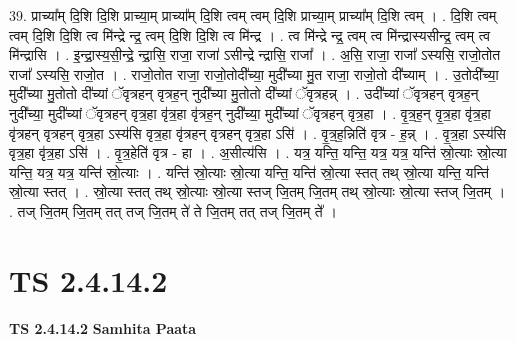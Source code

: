 \documentclass[17pt]{extarticle}
\begin{document}
39. प्राच्या᳚म् दि॒शि दि॒शि प्राच्या॒म् प्राच्या᳚म् दि॒शि त्वम् त्वम् दि॒शि प्राच्या॒म् प्राच्या᳚म् दि॒शि त्वम् । . दि॒शि त्वम् त्वम् दि॒शि दि॒शि त्व मि॑न्द्रे न्द्र॒ त्वम् दि॒शि दि॒शि त्व मि॑न्द्र । . त्व मि॑न्द्रे न्द्र॒ त्वम् त्व मि॑न्द्रास्यसीन्द्र॒ त्वम् त्व मि॑न्द्रासि । . इ॒न्द्रा॒स्य॒सी॒न्द्रे॒ न्द्रा॒सि॒ राजा॒ राजा॑ ऽसीन्द्रे न्द्रासि॒ राजा᳚ । . अ॒सि॒ राजा॒ राजा᳚ ऽस्यसि॒ राजो॒तोत राजा᳚ ऽस्यसि॒ राजो॒त । . राजो॒तोत राजा॒ राजो॒तोदी᳚च्या॒ मुदी᳚च्या मु॒त राजा॒ राजो॒तो दी᳚च्याम् । . उ॒तोदी᳚च्या॒ मुदी᳚च्या मु॒तोतो दी᳚च्यां ॅवृत्रहन् वृत्रह॒न् नुदी᳚च्या मु॒तोतो दी᳚च्यां ॅवृत्रहन्न् । . उदी᳚च्यां ॅवृत्रहन् वृत्रह॒न् नुदी᳚च्या॒ मुदी᳚च्यां ॅवृत्रहन् वृत्र॒हा वृ॑त्र॒हा वृ॑त्रह॒न् नुदी᳚च्या॒ मुदी᳚च्यां ॅवृत्रहन् वृत्र॒हा । . वृ॒त्र॒ह॒न् वृ॒त्र॒हा वृ॑त्र॒हा वृ॑त्रहन् वृत्रहन् वृत्र॒हा ऽस्य॑सि वृत्र॒हा वृ॑त्रहन् वृत्रहन् वृत्र॒हा ऽसि॑ । . वृ॒त्र॒ह॒न्निति॑ वृत्र - ह॒न्न् । . वृ॒त्र॒हा ऽस्य॑सि वृत्र॒हा वृ॑त्र॒हा ऽसि॑ । . वृ॒त्र॒हेति॑ वृत्र - हा । . अ॒सीत्य॑सि । . यत्र॒ यन्ति॒ यन्ति॒ यत्र॒ यत्र॒ यन्ति॑ स्रो॒त्याः स्रो॒त्या यन्ति॒ यत्र॒ यत्र॒ यन्ति॑ स्रो॒त्याः । . यन्ति॑ स्रो॒त्याः स्रो॒त्या यन्ति॒ यन्ति॑ स्रो॒त्या स्तत् तथ् स्रो॒त्या यन्ति॒ यन्ति॑ स्रो॒त्या स्तत् । . स्रो॒त्या स्तत् तथ् स्रो॒त्याः स्रो॒त्या स्तज् जि॒तम् जि॒तम् तथ् स्रो॒त्याः स्रो॒त्या स्तज् जि॒तम् । . तज् जि॒तम् जि॒तम् तत् तज् जि॒तम् ते॑ ते जि॒तम् तत् तज् जि॒तम् ते᳚ । \newline
\pagebreak
{}
\section*{ TS 2.4.14.2 }

\textbf{TS 2.4.14.2 } \newline
\textbf{Samhita Paata} \newline
\end{document}
